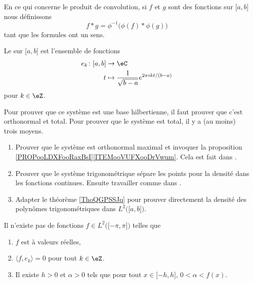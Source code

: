 \begin{definition}
	En ce qui concerne le produit de convolution, si \( f\) et \( g\) sont des fonctions sur \( \mathopen\lbrack a , b \mathclose]\) nous définissons
	\begin{equation}
		f*g=\phi^{-1}\big( \phi(f)*\phi(g) \big)
	\end{equation}
	tant que les formules ont un sens.
\end{definition}

\begin{definition}
	Le  sur \( \mathopen[ a , b \mathclose]\) est l'ensemble de fonctions
	\begin{equation}
		\begin{aligned}
			e_k\colon \mathopen[ a , b \mathclose] & \to \eC                                               \\
			t                                      & \mapsto  \frac{1}{ \sqrt{ b-a } } e^{2\pi i kt/(b-a)}
		\end{aligned}
	\end{equation}
	pour \( k\in \eZ\).
\end{definition}

\begin{normaltext}
	Pour prouver que ce système est une base hilbertienne, il faut prouver que c'est orthonormal et total. Pour prouver que le système est total, il y a (au moins) trois moyens.
	\begin{enumerate}
		\item
		      Prouver que le système est orthonormal maximal et invoquer la proposition \ref{PROPooLDXFooRaxBsI}\ref{ITEMooVUFXooDrVwum}. Cela est fait dans \cite{BIBooZYKMooGGbwyI}.
		\item
		      Prouver que le système trigonométrique sépare les points pour la densité dans les fonctions continues. Ensuite travailler comme dans \cite{BIBooQLKHooOlskCs}.
		\item
		      Adapter le théorème \ref{ThoQGPSSJq} pour prouver directement la densité des polynômes trigonométriques dans \( L^2\big( \mathopen[ a , b \mathclose] \big)\).
	\end{enumerate}
\end{normaltext}

\begin{proposition}	\label{PROPooKJQKooYeNxIq}
	Il n'existe pas de fonctions \( f\in L^2\big( \mathopen[ -\pi,\pi\mathclose] \big)\) telles que
	\begin{enumerate}
		\item
		      \( f\) est à valeurs réelles,
		\item
		      \( \langle f, e_k \rangle=0\) pour tout \( k\in \eZ\).
		\item
		      Il existe \( h>0\) et \( \alpha>0\) tels que pour tout \( x\in\mathopen[ -h,h\mathclose]\), \( 0<\alpha<f(x)\).
	\end{enumerate}
\end{proposition}


